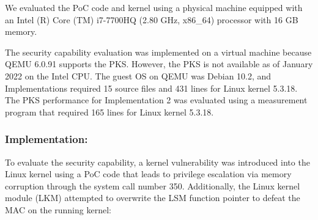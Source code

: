 %
We evaluated the PoC code and kernel using a physical machine equipped with an
Intel (R) Core (TM) i7-7700HQ (2.80 GHz, x86\_64) processor with 16 GB memory.
%
%

The security capability evaluation was implemented on a virtual machine because
QEMU 6.0.91 supports the PKS. However, the PKS is not available as of January
2022 on the Intel CPU.
%
The guest OS on QEMU was Debian 10.2, and Implementations required 15 source
files and 431 lines for Linux kernel 5.3.18.
%
The PKS performance for Implementation 2 was evaluated using a
measurement program that required 165 lines for Linux kernel 5.3.18.



\subsubsection{Implementation:}
%
%
To evaluate the security capability, a kernel vulnerability was introduced into
the Linux kernel using a PoC code \cite{CVE-2017-16995} that leads to privilege
escalation via memory corruption through the system call number 350.
%
Additionally, the Linux kernel module (LKM) attempted to overwrite the LSM function pointer to
defeat the MAC on the running kernel:

